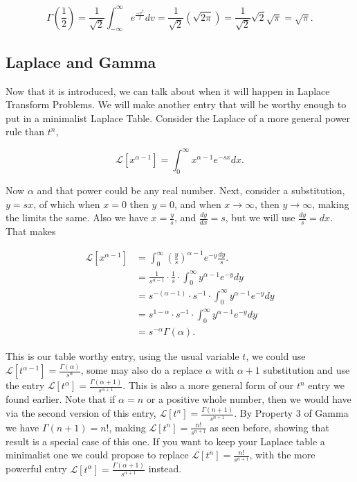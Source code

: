 \documentclass[12pt]{article}
\newcommand{\lp}{\mathscr{L}}
\begin{document}
\begin{equation*}
    \Gamma\left(\frac{1}{2}\right)=\frac{1}{\sqrt{2}}\int_{-\infty}^{\infty}e^{\frac{-v^2}{2}}dv=\frac{1}{\sqrt{2}}\left(\sqrt{2\pi}\right)=\frac{1}{\sqrt{2}}\sqrt{2}\sqrt{\pi}=\sqrt{\pi}.
\end{equation*}

\subsection{Laplace and Gamma}

Now that it is introduced, we can talk about when it will happen in Laplace Transform Problems. We will make another entry that will be worthy enough to put in a minimalist Laplace Table. Consider the Laplace of a more general power rule than $t^n$,

\begin{equation*}
    \lp[x^{\alpha-1}] = \int_{0}^{\infty} x^{\alpha-1}e^{-sx}dx.
\end{equation*}

Now $\alpha$ and that power could be any real number. Next, consider a substitution, $y=sx$, of which when $x=0$ then $y=0$, and when $x\rightarrow\infty$, then $y\rightarrow\infty$, making the limits the same. Also we have $x=\frac{y}{s}$, and $\frac{dy}{dx}=s$, but we will use $\frac{dy}{s}=dx$. That makes

\begin{align*}
    \lp[x^{\alpha-1}] &= \int_{0}^{\infty} \left(\frac{y}{s}\right)^{\alpha-1}e^{-y}\frac{dy}{s}. \\
    &= \frac{1}{s^{\alpha-1}}\cdot \frac{1}{s}\cdot \int_{0}^{\infty} y^{\alpha-1}e^{-y}dy \\
    &= s^{-(\alpha-1)}\cdot s^{-1}\cdot \int_{0}^{\infty} y^{\alpha-1}e^{-y}dy \\
    &=s^{1-\alpha}\cdot s^{-1}\cdot \int_{0}^{\infty} y^{\alpha-1}e^{-y}dy \\
    &=s^{-\alpha}\Gamma(\alpha).
\end{align*}

This is our table worthy entry, using the usual variable $t$, we could use $\lp[t^{\alpha-1}]=\frac{\Gamma(\alpha)}{s^{\alpha}}$, some may also do a replace $\alpha$ with $\alpha+1$ substitution and use the entry $\lp[t^{\alpha}]=\frac{\Gamma(\alpha+1)}{s^{\alpha+1}}$. This is also a more general form of our $t^n$ entry we found earlier. Note that if $\alpha=n$ or a positive whole number, then we would have via the second version of this entry, $\lp[t^{n}]=\frac{\Gamma(n+1)}{s^{n+1}}$. By Property 3 of Gamma we have $\Gamma(n+1)=n!$, making $\lp[t^{n}]=\frac{n!}{s^{n+1}}$ as seen before, showing that result is a special case of this one. If you want to keep your Laplace table a minimalist one we could propose to replace $\lp[t^{n}]=\frac{n!}{s^{n+1}}$, with the more powerful entry $\lp[t^{\alpha}]=\frac{\Gamma(\alpha+1)}{s^{\alpha+1}}$ instead. \\
\end{document}
